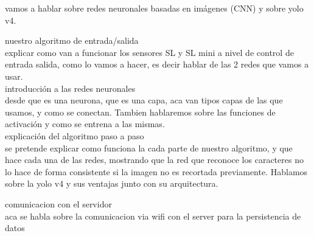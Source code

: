 


vamos a hablar sobre redes neuronales basadas en imágenes (CNN) y sobre yolo v4.

nuestro algoritmo de entrada/salida \\

explicar como van a funcionar los sensores SL y SL mini a nivel de control de entrada salida,
como lo vamos a hacer, es decir hablar de las 2 redes que vamos a usar. \\

introducción a las redes neuronales \\
desde que es una neurona, que es una capa, aca van tipos capas de las que usamos, y como se conectan. Tambien hablaremos sobre las funciones de activación y como se entrena a las mismas. \\

explicación del algoritmo paso a paso \\

se pretende explicar como funciona la cada parte de nuestro algoritmo, y que hace cada una de las redes, mostrando que la red que reconoce los caracteres no lo hace de forma consistente si la imagen no es recortada previamente. Hablamos sobre la yolo v4 y sus ventajas junto con su arquitectura.

comunicacion con el servidor \\

aca se habla sobre la comunicacion via wifi con el server para la persistencia de datos \\